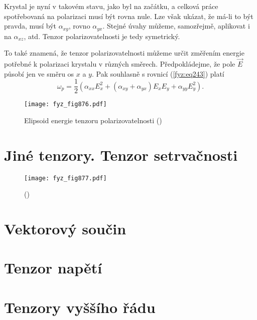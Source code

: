     Krystal je nyní v takovém stavu, jako byl na začátku, a celková práce spotřebovaná na polarizaci
    musí být rovna nule. Lze však ukázat, že má-li to být pravda, musí být \(\alpha_{xy}\), rovno
    \(\alpha_{yx}\). Stejné úvahy můžeme, samozřejmě, aplikovat i na \(\alpha_{xz}\), atd. Tenzor
    polarizovatelnosti je tedy symetrický.

    To také znamená, že tenzor polarizovatelnosti můžeme určit změřením energie potřebné k
    polarizaci krystalu v různých směrech. Předpokládejme, že pole \(\vec{E}\) působí jen ve směru
    os \(x\) a \(y\). Pak souhlasně s rovnicí (\ref{fyz:eq243}) platí
    \begin{equation}\label{fyz:eq244}
      \omega_p = \frac{1}{2}\left(\alpha_{xx}E_x^2 + 
                (\alpha_{xy} + \alpha_{yx})E_xE_y + \alpha_{yy}E_y^2\right).
    \end{equation}






    \begin{figure}[ht!] %
      \centering
      \texttt{[image: fyz\_fig876.pdf]}
      \caption{Elipsoid energie tenzoru polarizovatelnosti
               (\cite[s.~707]{Feynman02})}
      \label{fyz:fig876}
    \end{figure}

  \section{Jiné tenzory. Tenzor setrvačnosti}\label{fyz:IIchapXXXIsecIV}
    \begin{figure}[ht!] %
      \centering
      \texttt{[image: fyz\_fig877.pdf]}
      \caption{
              (\cite[s.~707]{Feynman02})}
      \label{fyz:fig877}
    \end{figure}

  \section{Vektorový součin}\label{fyz:IIchapXXXIsecV}
  \section{Tenzor napětí}\label{fyz:IIchapXXXIsecVI}
  \section{Tenzory vyššího řádu}\label{fyz:IIchapXXXIsecVII}
